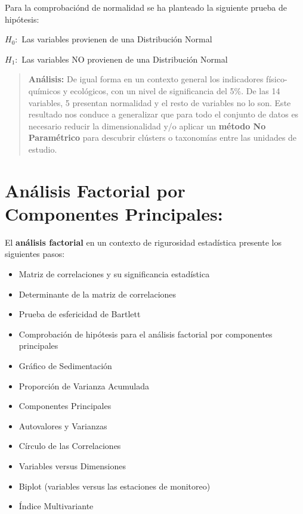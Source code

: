 \documentclass[
  10pt,
  letterpaper,
  DIV=11,
  numbers=noendperiod]{scrreprt}
\begin{document}
Para la comprobaciónd de normalidad se ha planteado la siguiente prueba
de hipótesis:

\(H_{0}:\) Las variables provienen de una Distribución Normal

\(H_{1}:\) Las variables NO provienen de una Distribución Normal

\begin{quote}
\textbf{Análisis:} De igual forma en un contexto general los indicadores
físico-químicos y ecológicos, con un nivel de significancia del 5\%. De
las 14 variables, 5 presentan normalidad y el resto de variables no lo
son. Este resultado nos conduce a generalizar que para todo el conjunto
de datos es necesario reducir la dimensionalidad y/o aplicar un
\textbf{método No Paramétrico} para descubrir clústers o taxonomías
entre las unidades de estudio.
\end{quote}

\hypertarget{anuxe1lisis-factorial-por-componentes-principales}{%
\chapter{Análisis Factorial por Componentes
Principales:}\label{anuxe1lisis-factorial-por-componentes-principales}}

El \textbf{análisis factorial} en un contexto de rigurosidad estadística
presente los siguientes pasos:

\begin{itemize}
\item
  Matriz de correlaciones y su significancia estadística
\item
  Determinante de la matriz de correlaciones
\item
  Prueba de esfericidad de Bartlett
\item
  Comprobación de hipótesis para el análisis factorial por componentes
  principales
\item
  Gráfico de Sedimentación
\item
  Proporción de Varianza Acumulada
\item
  Componentes Principales
\item
  Autovalores y Varianzas
\item
  Círculo de las Correlaciones
\item
  Variables versus Dimensiones
\item
  Biplot (variables versus las estaciones de monitoreo)
\item
  Índice Multivariante
\end{itemize}
\end{document}
